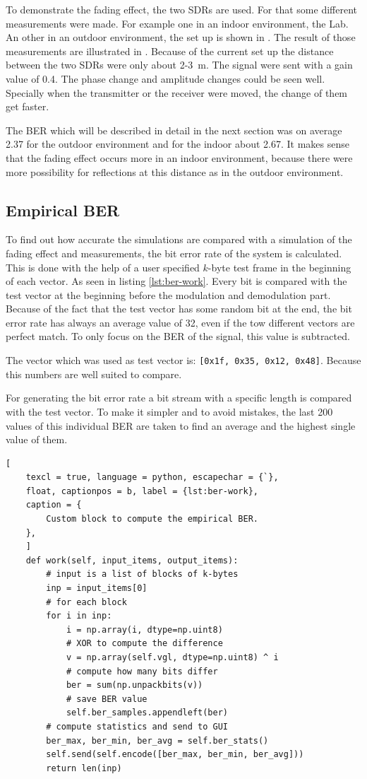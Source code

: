 To demonstrate the fading effect, the two SDRs are used. For that some different measurements were made.
For example one in an indoor environment, the Lab. An other in an outdoor environment, the set up is shown in .
The result of those measurements are illustrated in . Because of the current set up the distance between the two SDRs were only about \si{2}-\SI{3}{\meter}.
The signal were sent with a gain value of 0.4. The phase change and amplitude changes could be seen well. Specially when the transmitter or the receiver were moved, the change of them get faster.

The BER which will be described in detail in the next section was on average 2.37 for the outdoor environment and for the indoor about 2.67. It makes sense that the fading effect occurs more in an indoor environment, because there were more possibility for reflections at this distance as in the outdoor environment. 




\subsection{Empirical BER} \label{sec:ber}
To find out how accurate the simulations are compared with a simulation of the fading effect and measurements, the bit error rate of the system is calculated. This is done with the help of a user specified \(k\)-byte test frame in the beginning of each vector. As seen in listing \ref{lst:ber-work}. Every bit is compared with the test vector at the beginning before the modulation and demodulation part. 
Because of the fact that the test vector has some random bit at the end, the bit error rate has always an average value of 32, even if the tow different vectors are  perfect match. To only focus on the BER of the signal, this value is subtracted. 

The vector which was used as test vector is: \texttt{[0x1f, 0x35, 0x12, 0x48]}. Because this numbers are well suited to compare.%


For generating the bit error rate a bit stream with a specific length is compared with the test vector. To make it simpler and to avoid mistakes, the last 200 values of this individual BER are taken to find an average and the highest single value of them. 


\begin{lstlisting}[
	texcl = true, language = python, escapechar = {`},
	float, captionpos = b, label = {lst:ber-work},
	caption = {
		Custom block to compute the empirical BER.
	},
	]
	def work(self, input_items, output_items):
		# input is a list of blocks of k-bytes
		inp = input_items[0]
		# for each block
		for i in inp:
			i = np.array(i, dtype=np.uint8)
			# XOR to compute the difference
			v = np.array(self.vgl, dtype=np.uint8) ^ i
			# compute how many bits differ
			ber = sum(np.unpackbits(v))
			# save BER value
			self.ber_samples.appendleft(ber)
		# compute statistics and send to GUI
		ber_max, ber_min, ber_avg = self.ber_stats()
		self.send(self.encode([ber_max, ber_min, ber_avg]))
		return len(inp)
\end{lstlisting}

